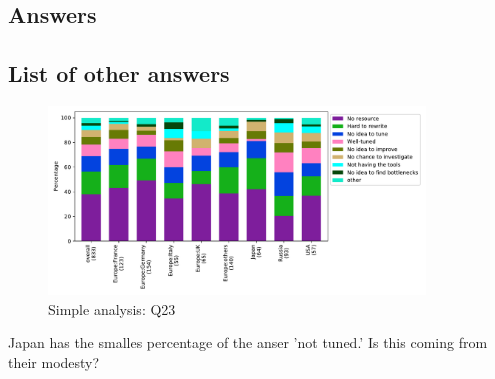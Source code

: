 
\subsection{Answers}


\subsection{List of other answers}
\begin{itemize}

\end{itemize}

\begin{figure}[htb]
\begin{center}
\includegraphics[width=10cm]{../pdfs/Q23.pdf}
\caption{Simple analysis: Q23}
\label{fig:Q23}
\end{center}
\end{figure}

Japan has the smalles percentage of the anser 'not tuned.' Is this
coming from their modesty?
